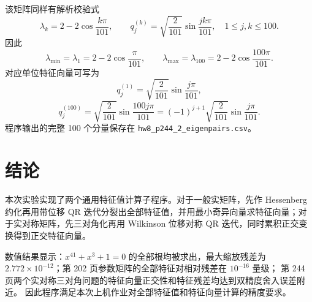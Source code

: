 \documentclass[a4paper,11pt]{article}
\newcommand{\file}[1]{\texttt{\small #1}}
\begin{document}
该矩阵同样有解析校验式
\[
    \lambda_k=2-2\cos\frac{k\pi}{101},\qquad
    q_j^{(k)}=\sqrt{\frac{2}{101}}\sin\frac{jk\pi}{101},\quad 1\le j,k\le 100.
\]
因此
\[
    \lambda_{\min}=\lambda_1=2-2\cos\frac{\pi}{101},\qquad
    \lambda_{\max}=\lambda_{100}=2-2\cos\frac{100\pi}{101}.
\]
对应单位特征向量可写为
\[
    q_j^{(1)}=\sqrt{\frac{2}{101}}\sin\frac{j\pi}{101},
\]
\[
    q_j^{(100)}=\sqrt{\frac{2}{101}}\sin\frac{100j\pi}{101}
    =(-1)^{j+1}\sqrt{\frac{2}{101}}\sin\frac{j\pi}{101}.
\]
程序输出的完整 100 个分量保存在 \file{hw8\_p244\_2\_eigenpairs.csv}。

\section{结论}
本次实验实现了两个通用特征值计算子程序。对于一般实矩阵，先作 Hessenberg 约化再用带位移
QR 迭代分裂出全部特征值，并用最小奇异向量求特征向量；对于实对称矩阵，先三对角化再用
Wilkinson 位移对称 QR 迭代，同时累积正交变换得到正交特征向量。

数值结果显示：$x^{41}+x^3+1=0$ 的全部根均被求出，最大缩放残差为
$2.772\times10^{-12}$；第 202 页参数矩阵的全部特征对相对残差在 $10^{-16}$ 量级；
第 244 页两个实对称三对角问题的特征向量正交性和特征残差均达到双精度舍入误差附近。
因此程序满足本次上机作业对全部特征值和特征向量计算的精度要求。
\end{document}
